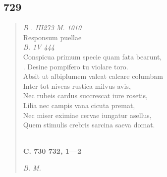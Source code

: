 \documentclass[11pt, a4paper]{report}
\begin{document}
            \subsection*{729}
      \begin{verse}
      \textit{B . III273 M. 1010} \\ Responsum puellae \\ \textit{B. 1V 444} \\ Conspicua primum specie quam fata bearunt, \\ . Desine pompifero tu violare toro. \\ Absit ut albiplumem valeat calcare columbam \\ Inter tot niveas rustica milvus avis, \\ Nec rubeis cardus succrescat iure rosetis, \\ Lilia nec campis vana cicuta premat, \\ Nec miser eximiae cervae iungatur asellus, \\ Quem stimulis crebris sarcina saeva domat. \\ 
        ﻿\pagebreak 
    \begin{center} \textbf{C. 730 732, 1—2} \end{center} \marginpar{[216]} \textit{B. M.} \\ 
      \end{verse}
  
\end{document}
